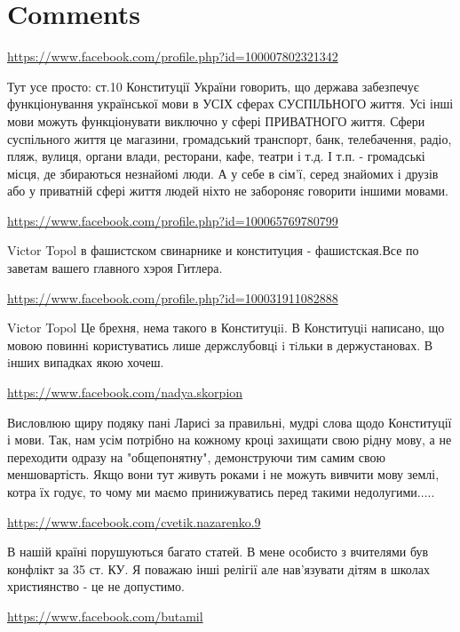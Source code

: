 \documentclass[a4paper,11pt]{extreport}
\begin{document}
\section{Comments}
\begin{itemize}
\url{https://www.facebook.com/profile.php?id=100007802321342}

Тут усе просто: ст.10 Конституції України говорить, що держава забезпечує функціонування української мови в УСІХ сферах СУСПІЛЬНОГО життя. Усі інші мови можуть функціонувати виключно у сфері ПРИВАТНОГО життя. Сфери суспільного життя це магазини, громадський транспорт, банк, телебачення, радіо, пляж, вулиця, органи влади, ресторани, кафе, театри і т.д. І т.п. - громадські місця, де збираються незнайомі люди. А у себе в сім'ї, серед знайомих і друзів або у приватній сфері життя людей ніхто не забороняє говорити іншими мовами.

\begin{itemize}
\url{https://www.facebook.com/profile.php?id=100065769780799}

Victor Topol в фашистском свинарнике и конституция - фашистская.Все по заветам вашего главного хэроя Гитлера.

\url{https://www.facebook.com/profile.php?id=100031911082888}

Victor Topol
Це брехня, нема такого в Конституцii. В Конституцii написано, що мовою повиннi користуватись лише держслубовцi i тiльки в держустановах. В iнших випадках якою хочеш.

\end{itemize}
\url{https://www.facebook.com/nadya.skorpion}

Висловлюю щиру подяку пані Ларисі за правильні, мудрі слова щодо Конституції і мови. Так, нам усім потрібно на кожному кроці захищати свою рідну мову, а не переходити одразу на "общепонятну", демонструючи тим самим свою меншовартість. Якщо вони тут живуть роками і не можуть вивчити мову землі, котра їх годує, то чому ми маємо принижуватись перед такими недолугими.....

\url{https://www.facebook.com/cvetik.nazarenko.9}

В нашій країні порушуються багато статей.
В мене особисто з вчителями був конфлікт за 35 ст. КУ. Я поважаю інші релігії але нав'язувати дітям в школах християнство - це не допустимо.

\url{https://www.facebook.com/butamil}


\end{itemize}
\end{document}
